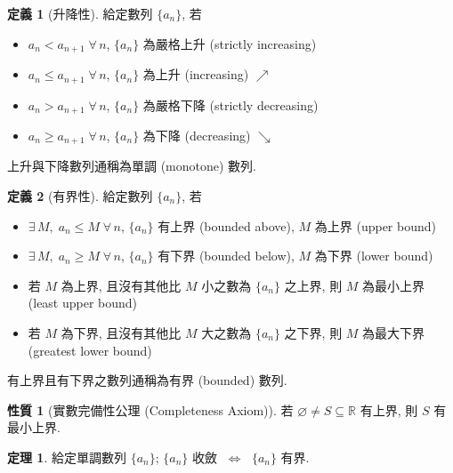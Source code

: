 \documentclass[12pt]{extarticle}
\newcommand{\ifff}{\;\Longleftrightarrow\;}
\theoremstyle{definition}
\newtheorem*{dfn}{定義}
\newtheorem*{prp}{性質}
\newtheorem*{thm}{定理}
\newcommand{\myline}{\noindent\makebox[\linewidth]{\rule{\paperwidth}{0.4pt}}}
\begin{document}
\myline

\begin{dfn}[升降性]
  給定數列 $\{a_n\}$, 若 
  \begin{itemize}\setlength{\itemsep}{0pt}
    \item $a_n < a_{n + 1}\;\forall\,n$, $\{a_n\}$ 為嚴格上升 (strictly increasing)  
    \item $a_n\leqslant a_{n + 1}\;\forall\,n$, $\{a_n\}$ 為上升 (increasing) $\nearrow$ 
    \item $a_n > a_{n + 1}\;\forall\,n$, $\{a_n\}$ 為嚴格下降 (strictly decreasing)   
    \item $a_n\geqslant a_{n + 1}\;\forall\,n$, $\{a_n\}$ 為下降 (decreasing) $\searrow$
  \end{itemize}
  上升與下降數列通稱為單調 (monotone) 數列. 
\end{dfn}

\begin{dfn}[有界性]
  給定數列 $\{a_n\}$, 若 
  \begin{itemize}\setlength{\itemsep}{0pt}
    \item $\exists\,M,\;a_n \leqslant M\;\forall\,n$, $\{a_n\}$ 有上界 (bounded above), $M$ 為上界 (upper bound)  
    \item $\exists\,M,\;a_n \geqslant M\;\forall\,n$, $\{a_n\}$ 有下界 (bounded below), $M$ 為下界 (lower bound)  
    \item 若 $M$ 為上界, 且沒有其他比 $M$ 小之數為 $\{a_n\}$ 之上界, 則 $M$ 為最小上界 (least upper bound)  
    \item 若 $M$ 為下界, 且沒有其他比 $M$ 大之數為 $\{a_n\}$ 之下界, 則 $M$ 為最大下界 (greatest lower bound)  
  \end{itemize}
  有上界且有下界之數列通稱為有界 (bounded) 數列. 
\end{dfn}

\begin{prp}[實數完備性公理 (Completeness Axiom)]
  若 $\varnothing\ne S\subseteq\mathbb{R}$ 有上界, 則 $S$ 有最小上界.  
\end{prp}

\begin{thm}
  給定單調數列 $\{a_n\}$; $\{a_n\}$ 收斂 $\ifff$ $\{a_n\}$ 有界.  
\end{thm}
\end{document}

